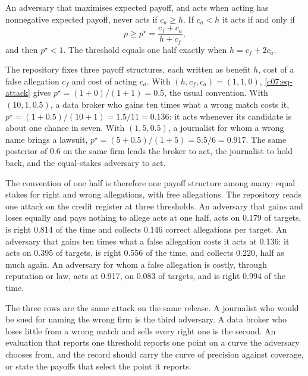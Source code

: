 \begin{proposition}\label{c07:prop-attack}
An adversary that maximises expected payoff, and acts when acting has nonnegative
expected payoff, never acts if $c_a \ge h$. If $c_a < h$ it acts if and only if
\begin{equation}\label{c07:eq-attack}
p \ge p^\star = \frac{c_f + c_a}{h + c_f},
\end{equation}
and then $p^\star < 1$. The threshold equals one half exactly when $h = c_f + 2c_a$.
\end{proposition}

\begin{example}\label{c07:ex-payoffs}
The repository fixes three payoff structures, each written as benefit $h$, cost of a
false allegation $c_f$ and cost of acting $c_a$. With $(h, c_f, c_a) = (1, 1, 0)$,
\eqref{c07:eq-attack} gives $p^\star = (1 + 0)/(1 + 1) = 0.5$, the usual convention. With
$(10, 1, 0.5)$, a data broker who gains ten times what a wrong match costs it,
$p^\star = (1 + 0.5)/(10 + 1) = 1.5/11 = 0.136$: it acts whenever its candidate is about
one chance in seven. With $(1, 5, 0.5)$, a journalist for whom a wrong name brings a
lawsuit, $p^\star = (5 + 0.5)/(1 + 5) = 5.5/6 = 0.917$. The same posterior of 0.6 on the
same firm leads the broker to act, the journalist to hold back, and the equal-stakes
adversary to act.
\end{example}

The convention of one half is therefore one payoff structure among many: equal
stakes for right and wrong allegations, with free allegations. The repository reads
one attack on the credit register at three thresholds. An adversary that gains and
loses equally and pays nothing to allege acts at one half, acts on 0.179 of
targets, is right 0.814 of the time and collects 0.146 correct allegations per
target. An adversary that gains ten times what a false allegation costs it acts at
0.136: it acts on 0.395 of targets, is right 0.556 of the time, and collects 0.220,
half as much again. An adversary for whom a false allegation is costly, through
reputation or law, acts at 0.917, on 0.083 of targets, and is right 0.994 of the
time.

The three rows are the same attack on the same release. A journalist who would be
sued for naming the wrong firm is the third adversary. A data broker who loses
little from a wrong match and sells every right one is the second. An evaluation
that reports one threshold reports one point on a curve the adversary chooses from,
and the record should carry the curve of precision against coverage, or state the
payoffs that select the point it reports.

